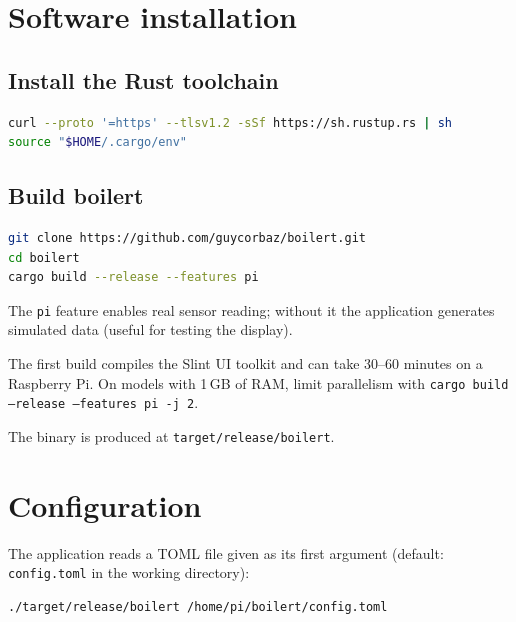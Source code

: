 \documentclass[11pt,a4paper,parskip=half]{scrartcl}
\newcommand{\code}[1]{\texttt{#1}}
\begin{document}
\section{Software installation}

\subsection{Install the Rust toolchain}

\begin{lstlisting}[language=bash]
curl --proto '=https' --tlsv1.2 -sSf https://sh.rustup.rs | sh
source "$HOME/.cargo/env"
\end{lstlisting}

\subsection{Build boilert}

\begin{lstlisting}[language=bash]
git clone https://github.com/guycorbaz/boilert.git
cd boilert
cargo build --release --features pi
\end{lstlisting}

The \code{pi} feature enables real sensor reading; without it the application
generates simulated data (useful for testing the display).

\begin{note}
The first build compiles the Slint UI toolkit and can take 30--60 minutes on
a Raspberry Pi. On models with 1\,GB of RAM, limit parallelism with
\code{cargo build --release --features pi -j 2}.
\end{note}

The binary is produced at \code{target/release/boilert}.

\section{Configuration}

The application reads a TOML file given as its first argument (default:
\code{config.toml} in the working directory):

\begin{lstlisting}[language=bash]
./target/release/boilert /home/pi/boilert/config.toml
\end{lstlisting}
\end{document}
